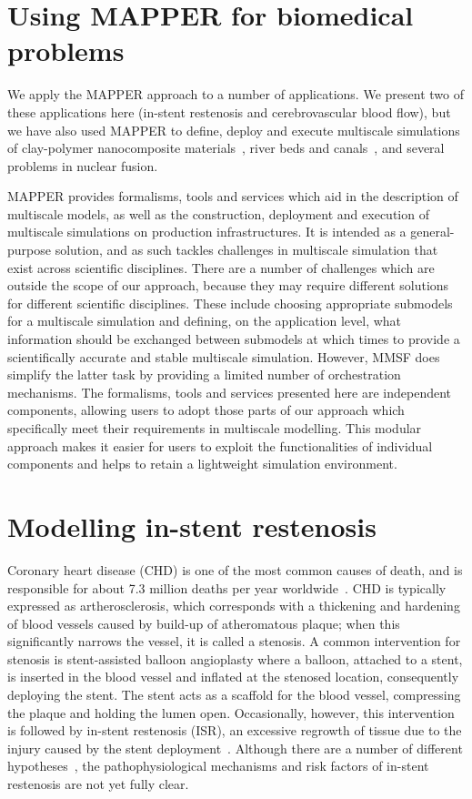 \documentclass[a4,10pt]{article}
\begin{document}
\section{Using MAPPER for biomedical problems}\label{Sec:reuse}

We apply the MAPPER approach to a number of applications. We present
two of these applications here (in-stent restenosis and cerebrovascular blood
flow), but we have also used MAPPER to define, deploy and execute multiscale
simulations of clay-polymer nanocomposite materials~\cite{Suter:2012}, river beds and
canals~\cite{BenBelgacem:2012}, and several problems in nuclear fusion.

MAPPER provides formalisms, tools and services which aid in the description of
multiscale models, as well as the construction, deployment and execution of
multiscale simulations on production infrastructures. It is intended as a
general-purpose solution, and as such tackles challenges in multiscale
simulation that exist across scientific disciplines. There are a number of
challenges which are outside the scope of our approach, because they may
require different solutions for different scientific disciplines. These include
choosing appropriate submodels for a multiscale simulation and defining, on
the application level, what information should be exchanged between submodels
at which times to provide a scientifically accurate and stable multiscale simulation.
However, MMSF does simplify the latter task by providing a limited
number of orchestration mechanisms.  The formalisms, tools and services
presented here are independent components, allowing users to adopt those parts
of our approach which  specifically meet their requirements in multiscale
modelling. This modular approach makes it easier for users to exploit the
functionalities of individual components and helps to retain a lightweight
simulation environment.

\section{Modelling in-stent restenosis}\label{Sec:ISR3D}

Coronary heart disease (CHD) is one of the most common causes of death, and 
is responsible for about 7.3 million deaths per year worldwide~\cite{WHO_CVD_report:2012}.  
CHD is typically expressed as artherosclerosis,
which corresponds with a thickening and hardening of blood vessels caused by
build-up of atheromatous plaque; when this significantly narrows the vessel, it
is called a stenosis. A common intervention for stenosis is stent-assisted
balloon angioplasty where a balloon, attached to a stent, is inserted in the
blood vessel and inflated at the stenosed location, consequently deploying the
stent. The stent acts as a scaffold for the blood vessel, compressing
the plaque and holding the lumen open. Occasionally, however, this intervention
is followed by in-stent restenosis (ISR), an excessive regrowth of tissue due
to the injury caused by the stent deployment~\cite{Moustapha:2001,Kastrati:2000}. 
Although there are a number of different
hypotheses~\cite{Jukema:2011}, the pathophysiological mechanisms and risk
factors of in-stent restenosis are not yet fully clear.
\end{document}
